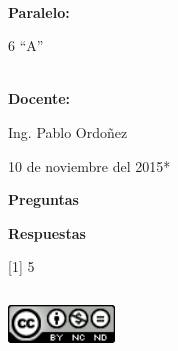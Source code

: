 \documentclass[9pt]{article}
\begin{document}
	\textbf{\\
		{\Large Paralelo:}\\
	}
	
	{\Large 6 ``A''}
	
	\textbf{\\
		{\Large Docente:}\\
	}
	
	{\Large Ing. Pablo Ordo\~nez}\\
	
	
	\begin{center}
		
		{\Large * 10 de noviembre del 2015*}
	\end{center}
	
\newpage

\begin{center}
\textbf{{\huge Preguntas}}

\end{center}







\newpage
\textbf{{\LARGE Respuestas\\
		}}


[1] 5
	

\begin{center}
	\includegraphics [width=80pt,height=50pt]{creative}\\
\end{center}	
\end{document}
